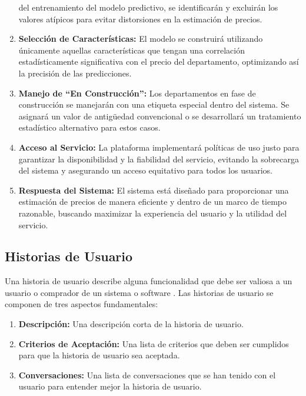 \begin{enumerate}
    del entrenamiento del modelo predictivo, se identificarán y excluirán los
    valores atípicos para evitar distorsiones en la estimación de precios.
  \item \textbf{Selección de Características:} El modelo se construirá utilizando
    únicamente aquellas características que tengan una correlación estadísticamente
    significativa con el precio del departamento, optimizando así la precisión de
    las predicciones.
  \item \textbf{Manejo de ``En Construcción'':} Los departamentos en fase de construcción
    se manejarán con una etiqueta especial dentro del sistema. Se asignará un valor
    de antigüedad convencional o se desarrollará un tratamiento estadístico
    alternativo para estos casos.
  \item \textbf{Acceso al Servicio:} La plataforma implementará políticas de uso
    justo para garantizar la disponibilidad y la fiabilidad del servicio, evitando
    la sobrecarga del sistema y asegurando un acceso equitativo para todos los usuarios.
  \item \textbf{Respuesta del Sistema:} El sistema está diseñado para proporcionar
    una estimación de precios de manera eficiente y dentro de un marco de tiempo
    razonable, buscando maximizar la experiencia del usuario y la utilidad del
    servicio.
\end{enumerate}

\subsection{Historias de Usuario}

Una historia de usuario describe alguna funcionalidad que debe ser valiosa a un
usuario o comprador de un sistema o software \cite{cohn2004user}. Las historias de usuario se
componen de tres aspectos fundamentales:

\begin{enumerate}
  \item \textbf{Descripción:} Una descripción corta de la historia de usuario.
  \item \textbf{Criterios de Aceptación:} Una lista de criterios que deben ser
    cumplidos para que la historia de usuario sea aceptada.
  \item \textbf{Conversaciones:} Una lista de conversaciones que se han tenido
    con el usuario para entender mejor la historia de usuario.
\end{enumerate}

